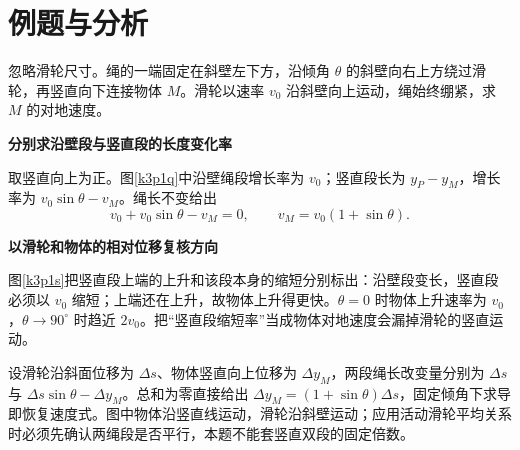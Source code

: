 \section{例题与分析}
\begin{question}\begin{example}[沿斜壁移动的滑轮]\label{k3p1}
忽略滑轮尺寸。绳的一端固定在斜壁左下方，沿倾角 $\theta$ 的斜壁向右上方绕过滑轮，再竖直向下连接物体 $M$。滑轮以速率 $v_0$ 沿斜壁向上运动，绳始终绷紧，求 $M$ 的对地速度。\end{example}
\end{question}
\begin{solution}\textbf{分别求沿壁段与竖直段的长度变化率}\par\nobreak
取竖直向上为正。图\ref{k3p1q}中沿壁绳段增长率为 $v_0$；竖直段长为 $y_P-y_M$，增长率为 $v_0\sin\theta-v_M$。绳长不变给出
\[v_0+v_0\sin\theta-v_M=0,\qquad \boxed{v_M=v_0(1+\sin\theta)}.\]



\par\medskip{}\noindent\textbf{以滑轮和物体的相对位移复核方向}\par\nobreak
图\ref{k3p1s}把竖直段上端的上升和该段本身的缩短分别标出：沿壁段变长，竖直段必须以 $v_0$ 缩短；上端还在上升，故物体上升得更快。$\theta=0$ 时物体上升速率为 $v_0$，$\theta\to90^\circ$ 时趋近 $2v_0$。把“竖直段缩短率”当成物体对地速度会漏掉滑轮的竖直运动。

设滑轮沿斜面位移为 $\Delta s$、物体竖直向上位移为 $\Delta y_M$，两段绳长改变量分别为 $\Delta s$与 $\Delta s\sin\theta-\Delta y_M$。总和为零直接给出 $\Delta y_M=(1+\sin\theta)\Delta s$，固定倾角下求导即恢复速度式。图中物体沿竖直线运动，滑轮沿斜壁运动；应用活动滑轮平均关系时必须先确认两绳段是否平行，本题不能套竖直双段的固定倍数。\end{solution}

